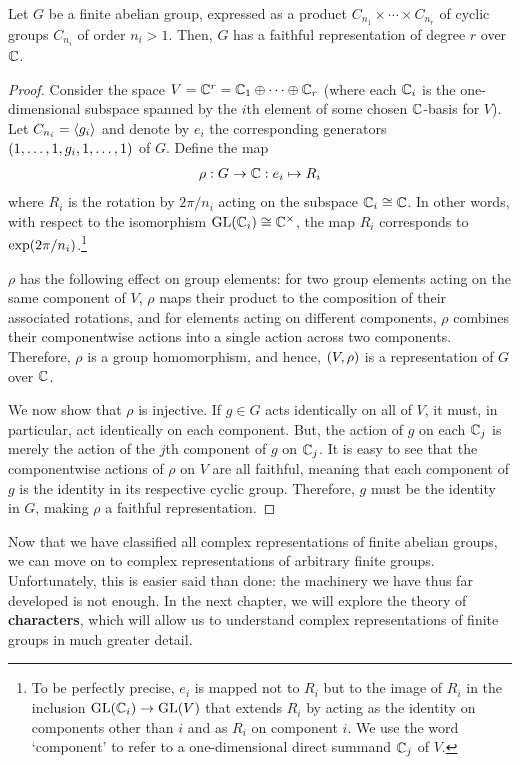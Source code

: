 \begin{lemma}
    Let $G$ be a finite abelian group, expressed as a product $C_{n_1} \times \cdots \times C_{n_r}$ of cyclic groups $C_{n_i}$ of order $n_i > 1$. Then, $G$ has a faithful representation of degree $r$ over $\mathbb{C}$.
\end{lemma}
\begin{proof}
    Consider the space $V = \mathbb{C}^r = \mathbb{C}_1 \oplus \cdots \oplus \mathbb{C}_r$ (where each $\mathbb{C}_i$ is the one-dimensional subspace spanned by the $i$th element of some chosen $\mathbb{C}$-basis for $V$). Let $C_{n_i} = \left\langle g_i \right\rangle$ and denote by $e_i$ the corresponding generators $\left( 1, \ldots, 1, g_i, 1, \ldots, 1 \right)$ of $G$. Define the map
    \begin{align*}
        \rho : G \to \mathbb{C} : e_i \mapsto R_{i}
    \end{align*}
    where $R_i$ is the rotation by $2\pi / n_i$ acting on the subspace $\mathbb{C}_i \cong \mathbb{C}$. In other words, with respect to the isomorphism $\operatorname{GL}\!\left( \mathbb{C}_i \right) \cong \mathbb{C}^{\times}$, the map $R_i$ corresponds to $\exp\!\left( {2\pi}/{n_i} \right)$.\footnote{To be perfectly precise, $e_i$ is mapped not to $R_i$ but to the image of $R_i$ in the inclusion $\operatorname{GL}\!\left( \mathbb{C}_i \right) \to \operatorname{GL}\!\left( V \right)$ that extends $R_i$ by acting as the identity on components other than $i$ and as $R_i$ on component $i$. We use the word `component' to refer to a one-dimensional direct summand $\mathbb{C}_j$ of $V$.}

    $\rho$ has the following effect on group elements: for two group elements acting on the same component of $V$, $\rho$ maps their product to the composition of their associated rotations, and for elements acting on different components, $\rho$ combines their componentwise actions into a single action across two components. Therefore, $\rho$ is a group homomorphism, and hence, $\left( V, \rho \right)$ is a representation of $G$ over $\mathbb{C}$.

    We now show that $\rho$ is injective. If $g \in G$ acts identically on all of $V$, it must, in particular, act identically on each component. But, the action of $g$ on each $\mathbb{C}_j$ is merely the action of the $j$th component of $g$ on $\mathbb{C}_j$. It is easy to see that the componentwise actions of $\rho$ on $V$ are all faithful, meaning that each component of $g$ is the identity in its respective cyclic group. Therefore, $g$ must be the identity in $G$, making $\rho$ a faithful representation.
\end{proof}

Now that we have classified all complex representations of finite abelian groups, we can move on to complex representations of arbitrary finite groups. Unfortunately, this is easier said than done: the machinery we have thus far developed is not enough. In the next chapter, we will explore the theory of \textbf{characters}, which will allow us to understand complex representations of finite groups in much greater detail.